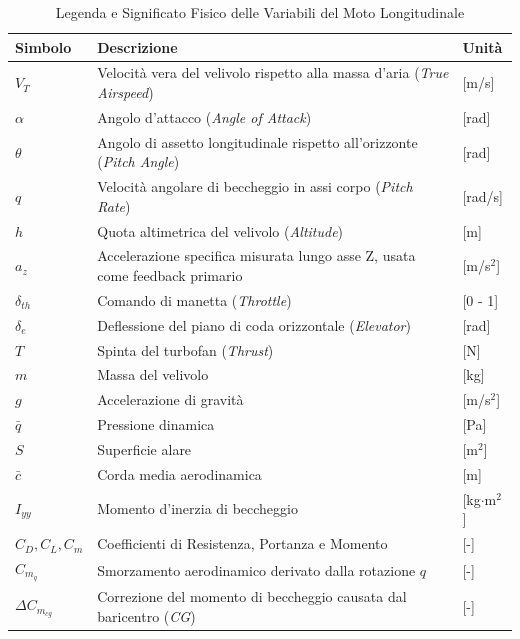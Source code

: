 \begin{table}[H]
	\centering
	\footnotesize
	\renewcommand{\arraystretch}{1.1}
	\begin{tabular}{p{} p{} p{}}
		\toprule
		\textbf{Simbolo} & \textbf{Descrizione} & \textbf{Unità} \\
		\midrule
		$V_T$ & Velocità vera del velivolo rispetto alla massa d'aria (\textit{True Airspeed}) & [m/s] \\
		$\alpha$ & Angolo d'attacco (\textit{Angle of Attack}) & [rad] \\
		$\theta$ & Angolo di assetto longitudinale rispetto all'orizzonte (\textit{Pitch Angle}) & [rad] \\
		$q$ & Velocità angolare di beccheggio in assi corpo (\textit{Pitch Rate}) & [rad/s] \\
		$h$ & Quota altimetrica del velivolo (\textit{Altitude}) & [m] \\
		$a_z$ & Accelerazione specifica misurata lungo asse Z, usata come feedback primario & [m/s$^2$] \\
		$\delta_{th}$ & Comando di manetta (\textit{Throttle}) & [0 - 1] \\
		$\delta_e$ & Deflessione del piano di coda orizzontale (\textit{Elevator}) & [rad] \\
		$T$ & Spinta del turbofan (\textit{Thrust}) & [N] \\
		$m$ & Massa del velivolo & [kg] \\
		$g$ & Accelerazione di gravità & [m/s$^2$] \\
		$\bar{q}$ & Pressione dinamica & [Pa] \\
		$S$ & Superficie alare & [m$^2$] \\
		$\bar{c}$ & Corda media aerodinamica & [m] \\
		$I_{yy}$ & Momento d'inerzia di beccheggio & [kg$\cdot$m$^2$] \\
		$C_D, C_L, C_m$ & Coefficienti di Resistenza, Portanza e Momento & [-] \\
		$C_{m_q}$ & Smorzamento aerodinamico derivato dalla rotazione $q$ & [-] \\
		$\Delta C_{m_{cg}}$ & Correzione del momento di beccheggio causata dal baricentro (\textit{CG}) & [-] \\
		\bottomrule
	\end{tabular}
	\caption{Legenda e Significato Fisico delle Variabili del Moto Longitudinale}
	\label{tab:longitudinal_vars}
\end{table}

